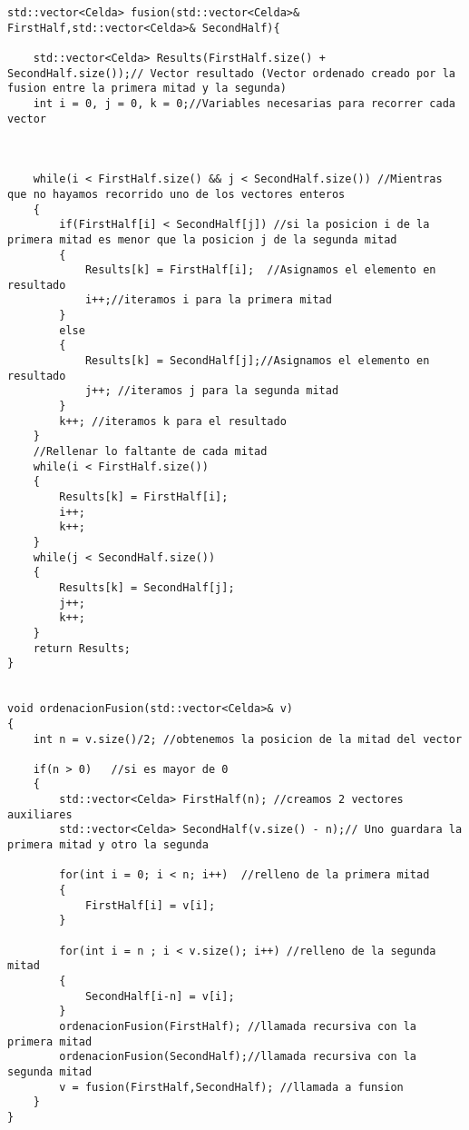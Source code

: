 
\begin{lstlisting}[frame=single,basicstyle=\tiny,title={Algoritmo de Fusión}]
std::vector<Celda> fusion(std::vector<Celda>& FirstHalf,std::vector<Celda>& SecondHalf){

	std::vector<Celda> Results(FirstHalf.size() + SecondHalf.size());// Vector resultado (Vector ordenado creado por la fusion entre la primera mitad y la segunda)
	int i = 0, j = 0, k = 0;//Variables necesarias para recorrer cada vector
	
	
	
	while(i < FirstHalf.size() && j < SecondHalf.size()) //Mientras que no hayamos recorrido uno de los vectores enteros
	{
		if(FirstHalf[i] < SecondHalf[j]) //si la posicion i de la primera mitad es menor que la posicion j de la segunda mitad
		{
			Results[k] = FirstHalf[i];	//Asignamos el elemento en resultado
			i++;//iteramos i para la primera mitad
		}
		else
		{
			Results[k] = SecondHalf[j];//Asignamos el elemento en resultado
			j++; //iteramos j para la segunda mitad
		}
		k++; //iteramos k para el resultado
	}
	//Rellenar lo faltante de cada mitad
	while(i < FirstHalf.size())
	{
		Results[k] = FirstHalf[i];
		i++;
		k++;
	}
	while(j < SecondHalf.size())
	{
		Results[k] = SecondHalf[j];
		j++;
		k++;
	}
	return Results;
}


void ordenacionFusion(std::vector<Celda>& v)
{
    int n = v.size()/2; //obtenemos la posicion de la mitad del vector
    
    if(n > 0)	//si es mayor de 0
    {
    	std::vector<Celda> FirstHalf(n); //creamos 2 vectores auxiliares
    	std::vector<Celda> SecondHalf(v.size() - n);// Uno guardara la primera mitad y otro la segunda
    	
    	for(int i = 0; i < n; i++)	//relleno de la primera mitad
    	{
    		FirstHalf[i] = v[i];
    	}
    	
    	for(int i = n ; i < v.size(); i++) //relleno de la segunda mitad
    	{
    		SecondHalf[i-n] = v[i];
    	}
    	ordenacionFusion(FirstHalf); //llamada recursiva con la primera mitad
    	ordenacionFusion(SecondHalf);//llamada recursiva con la segunda mitad
    	v = fusion(FirstHalf,SecondHalf); //llamada a funsion
    }
}
\end{lstlisting}
